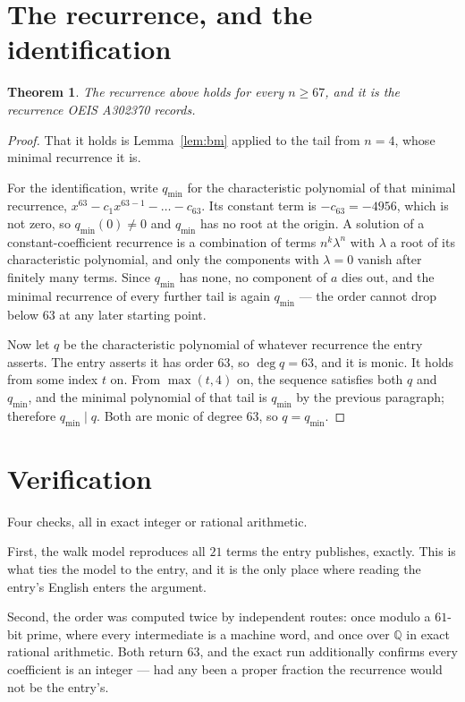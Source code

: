 \documentclass[11pt,a4paper]{article}
\theoremstyle{plain}
\newtheorem{theorem}{Theorem}
\theoremstyle{definition}
\begin{document}
\section{The recurrence, and the identification}

\begin{theorem}
The recurrence above holds for every $n\ge67$, and it is the recurrence OEIS A302370 records.
\end{theorem}

\begin{proof}
That it holds is Lemma~\ref{lem:bm} applied to the tail from $n=4$, whose minimal
recurrence it is.

For the identification, write $q_{\min}$ for the characteristic polynomial of that minimal
recurrence, $x^{63}-c_1x^{63-1}-\dots-c_{63}$. Its constant term is
$-c_{63}=-4956$, which is not zero, so $q_{\min}(0)\neq0$ and $q_{\min}$ has no
root at the origin. A solution of a constant-coefficient recurrence is a combination of terms
$n^{k}\lambda^{n}$ with $\lambda$ a root of its characteristic polynomial, and only the
components with $\lambda=0$ vanish after finitely many terms. Since $q_{\min}$ has none, no
component of $a$ dies out, and the minimal recurrence of every further tail is again
$q_{\min}$ --- the order cannot drop below $63$ at any later starting point.

Now let $q$ be the characteristic polynomial of whatever recurrence the entry asserts. The
entry asserts it has order $63$, so $\deg q=63$, and it is monic. It holds from some
index $t$ on. From $\max(t,4)$ on, the sequence satisfies both $q$ and $q_{\min}$, and
the minimal polynomial of that tail is $q_{\min}$ by the previous paragraph; therefore
$q_{\min}\mid q$. Both are monic of degree $63$, so $q=q_{\min}$.
\end{proof}

\section{Verification}

Four checks, all in exact integer or rational arithmetic.

First, the walk model reproduces all $21$ terms the entry publishes, exactly. This is
what ties the model to the entry, and it is the only place where reading the entry's English
enters the argument.

Second, the order was computed twice by independent routes: once modulo a $61$-bit prime, where
every intermediate is a machine word, and once over $\mathbb{Q}$ in exact rational arithmetic.
Both return $63$, and the exact run additionally confirms every coefficient is an integer
--- had any been a proper fraction the recurrence would not be the entry's.
\end{document}
